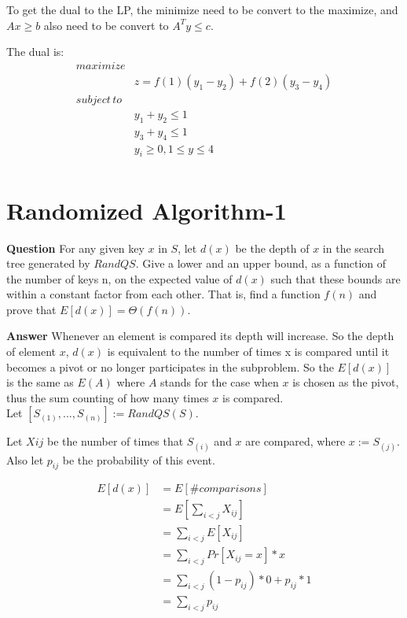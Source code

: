 \documentclass[12pt]{article}
\begin{document}
To get the dual to the LP,  the minimize need to be convert to the maximize, and $Ax \geq b$ also need to be convert to $A^Ty \leq c$.

The dual is:
\begin{equation}
\begin{aligned}
maximize& \\
& z = f(1)(y_{1} - y_{2}) + f(2)(y_{3} - y_{4}) \\
subject \, to&  \\
& y_{1} + y_{2} \leq 1\\
& y_{3} + y_{4} \leq 1\\
& y_{i}\geq 0, 1\leq y \leq 4\\
\end{aligned}
\end{equation}

\section{Randomized Algorithm-1}
\textbf{Question}
For any given key $x$ in $S$, let $d(x)$ be the depth of $x$ in the search tree generated by $RandQS$. Give a lower and an upper bound, as a function of the number of keys n, on the expected value of $d(x)$ such that these bounds are within a constant factor from each other. That is, find a function $f(n)$ and prove that $E[d(x)]=\Theta(f(n))$.

\textbf{Answer}
Whenever an element is compared its depth will increase. So the depth of element $x$, $d(x)$ is equivalent to the number of times x is compared until it becomes a pivot or no longer participates in the subproblem. So the $E[d(x)]$ is the same as $E(A)$ where $A$ stands for the case when $x$ is chosen as the pivot, thus the sum counting of how many times $x$ is compared. \\

Let $[S_{(1)}, ..., S_{(n)}] := RandQS(S)$. 

Let $Xij$ be the number of times that $S_{(i)}$ and $x$ are compared, where $x:=S_{(j)}$. Also let $p_{ij}$ be the probability of this event.

\begin{equation}
\begin{aligned}
E[d(x)] &= E[\#comparisons] \\
&= E[\sum_{i<j} X_{ij}]\\
&=\sum_{i<j} E[X_{ij}]\\
&=\sum_{i<j} Pr[X_{ij} = x] * x\\
&= \sum_{i<j}  (1-p_{ij}) * 0 + p_{ij} * 1\\
&=  \sum_{i<j} p_{ij}
\end{aligned}
\end{equation}
\end{document}
